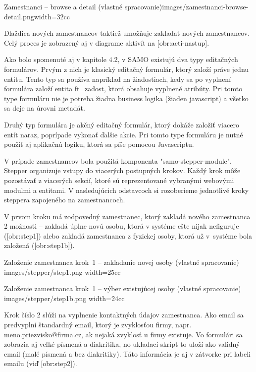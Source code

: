 {Zamestnanci -- browse a detail (vlastné spracovanie)}{images/zamestnanci-browse-detail.png}{width=32cc} 

Dlaždica nových zamestnancov taktiež umožňuje zakladať nových zamestnancov. Celý proces je zobrazený aj v diagrame aktivít na [obr:acti-nastup]. 

Ako bolo spomenuté aj v kapitole 4.2, v  SAMO existujú dva typy editačných formulárov. Prvým z nich je klasický editačný formulár, ktorý založí práve jednu entitu. Tento typ sa používa napríklad na žiadostiach, kedy sa po vyplnení formulára založí entita ft\_zadost, ktorá obsahuje vyplnené atribúty. Pri tomto type formuláru nie je potreba žiadna business logika (žiaden javascript) a všetko sa deje na úrovni metadát. 

Druhý typ formulára je akčný editačný formulár, ktorý dokáže založiť viacero entít naraz, poprípade vykonať ďalšie akcie. Pri tomto type formuláru je nutné použiť aj aplikačnú logiku, ktorá sa píše pomocou Javascriptu. 

V prípade zamestnancov bola použitá komponenta "samo-stepper-module". Stepper organizuje vstupy do viacerých postupných krokov. Každý krok môže pozostávať z viacerých sekcií, ktoré sú reprezentované vybranými webovými modulmi a entitami. V nasledujúcich odstavcoch si rozoberieme jednotlivé kro\-ky steppera zapojeného na zamestnancoch.

\blank
V prvom kroku má zodpovedný zamestnanec, ktorý zakladá nového zamestnanca 2 možnosti -- zakladá úplne novú osobu, ktorá v systéme ešte nijak nefiguruje ([obr:step1]) alebo zakladá zamestnanca z fyzickej osoby, ktorá už v~systéme bola založená ([obr:step1b]).

{Založenie zamestnanca krok~1 -- zakladanie novej osoby (vlastné spracovanie)}
{images/stepper/step1.png}
{width=25cc} 

{Založenie zamestnanca krok~1 -- výber existujúcej osoby (vlastné spracovanie)}
{images/stepper/step1b.png}
{width=24cc} 

Krok číslo 2 slúži na vyplnenie kontaktných údajov zamestnanca. Ako email sa predvyplní štandardný email, ktorý je zvyklosťou firmy, napr. meno.priezvisko@firma.cz, ak nejaká zvyklosť u firmy existuje. Vo formulári sa zobrazia aj veľké písmená a diakritika, no ukladací skript to uloží ako validný email (malé písmená a bez diakritiky). Táto informácia je aj v zátvorke pri labeli emailu (viď [obr:step2]).

